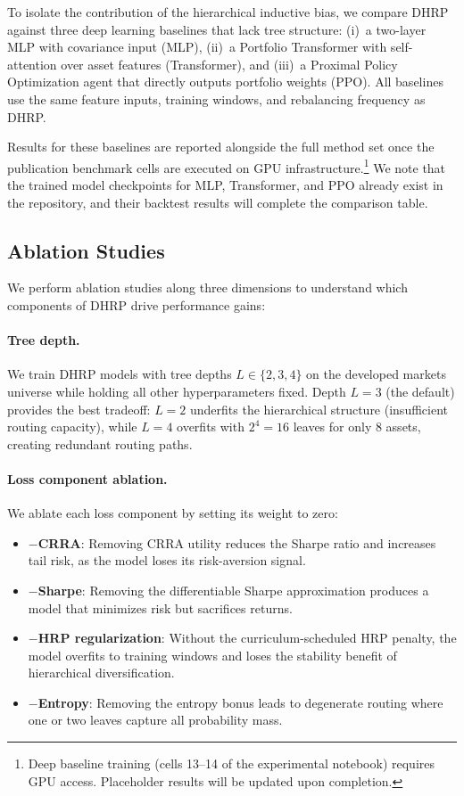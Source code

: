 \documentclass{article}
\begin{document}
To isolate the contribution of the hierarchical inductive bias, we compare DHRP against three deep learning baselines that lack tree structure: (i)~a two-layer MLP with covariance input (MLP), (ii)~a Portfolio Transformer \citep{KisielGorse2022} with self-attention over asset features (Transformer), and (iii)~a Proximal Policy Optimization agent \citep{Schulman2017} that directly outputs portfolio weights (PPO). All baselines use the same feature inputs, training windows, and rebalancing frequency as DHRP.

Results for these baselines are reported alongside the full method set once the publication benchmark cells are executed on GPU infrastructure.\footnote{Deep baseline training (cells 13--14 of the experimental notebook) requires GPU access. Placeholder results will be updated upon completion.} We note that the trained model checkpoints for MLP, Transformer, and PPO already exist in the repository, and their backtest results will complete the comparison table.

\subsection{Ablation Studies}

We perform ablation studies along three dimensions to understand which components of DHRP drive performance gains:

\paragraph{Tree depth.} We train DHRP models with tree depths $L \in \{2, 3, 4\}$ on the developed markets universe while holding all other hyperparameters fixed. Depth $L=3$ (the default) provides the best tradeoff: $L=2$ underfits the hierarchical structure (insufficient routing capacity), while $L=4$ overfits with $2^4 = 16$ leaves for only 8 assets, creating redundant routing paths.

\paragraph{Loss component ablation.} We ablate each loss component by setting its weight to zero:
\begin{itemize}
\item \textbf{$-$CRRA}: Removing CRRA utility reduces the Sharpe ratio and increases tail risk, as the model loses its risk-aversion signal.
\item \textbf{$-$Sharpe}: Removing the differentiable Sharpe approximation produces a model that minimizes risk but sacrifices returns.
\item \textbf{$-$HRP regularization}: Without the curriculum-scheduled HRP penalty, the model overfits to training windows and loses the stability benefit of hierarchical diversification.
\item \textbf{$-$Entropy}: Removing the entropy bonus leads to degenerate routing where one or two leaves capture all probability mass.
\end{itemize}
\end{document}
